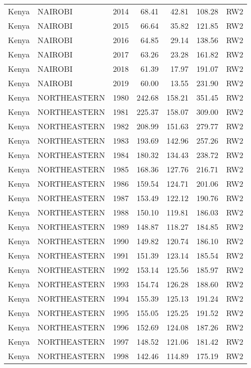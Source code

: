 \begin{longtable}{lllrrrl}
  Kenya & NAIROBI & 2014 & 68.41 & 42.81 & 108.28 & RW2 \\ 
  Kenya & NAIROBI & 2015 & 66.64 & 35.82 & 121.85 & RW2 \\ 
  Kenya & NAIROBI & 2016 & 64.85 & 29.14 & 138.56 & RW2 \\ 
  Kenya & NAIROBI & 2017 & 63.26 & 23.28 & 161.82 & RW2 \\ 
  Kenya & NAIROBI & 2018 & 61.39 & 17.97 & 191.07 & RW2 \\ 
  Kenya & NAIROBI & 2019 & 60.00 & 13.55 & 231.90 & RW2 \\ 
  Kenya & NORTHEASTERN & 1980 & 242.68 & 158.21 & 351.45 & RW2 \\ 
  Kenya & NORTHEASTERN & 1981 & 225.37 & 158.07 & 309.00 & RW2 \\ 
  Kenya & NORTHEASTERN & 1982 & 208.99 & 151.63 & 279.77 & RW2 \\ 
  Kenya & NORTHEASTERN & 1983 & 193.69 & 142.96 & 257.26 & RW2 \\ 
  Kenya & NORTHEASTERN & 1984 & 180.32 & 134.43 & 238.72 & RW2 \\ 
  Kenya & NORTHEASTERN & 1985 & 168.36 & 127.76 & 216.71 & RW2 \\ 
  Kenya & NORTHEASTERN & 1986 & 159.54 & 124.71 & 201.06 & RW2 \\ 
  Kenya & NORTHEASTERN & 1987 & 153.49 & 122.12 & 190.76 & RW2 \\ 
  Kenya & NORTHEASTERN & 1988 & 150.10 & 119.81 & 186.03 & RW2 \\ 
  Kenya & NORTHEASTERN & 1989 & 148.87 & 118.27 & 184.85 & RW2 \\ 
  Kenya & NORTHEASTERN & 1990 & 149.82 & 120.74 & 186.10 & RW2 \\ 
  Kenya & NORTHEASTERN & 1991 & 151.39 & 123.14 & 185.54 & RW2 \\ 
  Kenya & NORTHEASTERN & 1992 & 153.14 & 125.56 & 185.97 & RW2 \\ 
  Kenya & NORTHEASTERN & 1993 & 154.74 & 126.28 & 188.60 & RW2 \\ 
  Kenya & NORTHEASTERN & 1994 & 155.39 & 125.13 & 191.24 & RW2 \\ 
  Kenya & NORTHEASTERN & 1995 & 155.05 & 125.25 & 191.52 & RW2 \\ 
  Kenya & NORTHEASTERN & 1996 & 152.69 & 124.08 & 187.26 & RW2 \\ 
  Kenya & NORTHEASTERN & 1997 & 148.52 & 121.06 & 181.42 & RW2 \\ 
  Kenya & NORTHEASTERN & 1998 & 142.46 & 114.89 & 175.19 & RW2 \\ 

\end{longtable}

